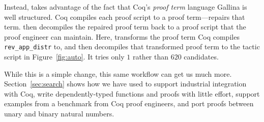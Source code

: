 Instead, \toolname takes advantage of the fact that Coq's \textit{proof term} language Gallina is well structured.
Coq compiles each proof script to a proof term---\toolname repairs that term.
\toolname then decompiles the repaired proof term back to a proof script that the proof engineer can maintain.
Here, \toolname transforms the proof term Coq compiles \lstinline{rev_app_distr} to,
and then decompiles that transformed proof term to the tactic script in Figure~\ref{fig:auto}.
It tries only $1$ rather than $620$ candidates. 

While this is a simple change, this same workflow can get us much more.
Section~\ref{sec:search} shows how we have used \toolname to support industrial integration with Coq,
write dependently-typed functions and proofs with little effort,
support examples from a benchmark from Coq proof engineers,
and port proofs between unary and binary natural numbers.




